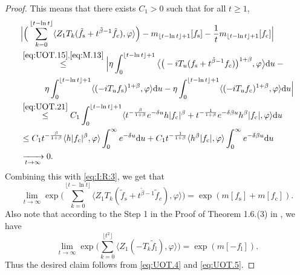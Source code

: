 \documentclass[12pt,a4paper]{amsart}
\theoremstyle{plain}
\theoremstyle{definition}
\numberwithin{equation}{section}
\begin{document}
\begin{proof}
	This means that there exists $C_1 >0$ such that for all $t\geq 1$,
\begin{align}
	&\Big|\Big(\sum_{k=0}^{\lfloor t-\ln t \rfloor} \langle Z_1T_{k}(\tilde f_\mathrm s+t^{\tilde{\beta}-1}\tilde{f}_c), \varphi\rangle \Big)-m_{\lfloor t-\ln t \rfloor+1}[f_\mathrm s]-\frac{1}{t}m_{\lfloor t-\ln t \rfloor+1}[f_\mathrm c]\Big|
	\\&
\begin{multlined}
	\overset{\eqref{eq:UOT.15},\eqref{eq:M.13}}\leq\Big| \eta \int_0^{\lfloor t-\ln t \rfloor+1}\big\langle \big(-iT_u(f_\mathrm s+t^{\tilde{\beta}-1}f_\mathrm c)\big)^{1+\beta},\varphi \big\rangle \mathrm du - {}
	\\ \eta \int_0^{\lfloor t-\ln t \rfloor+1} \langle (-iT_u f_\mathrm s)^{1+\beta}, \varphi \rangle  \mathrm du - \eta \int_0^{\lfloor t-\ln t \rfloor+1} \langle (-iT_u f_\mathrm c)^{1+\beta}, \varphi \rangle  \mathrm du\Big|
\end{multlined}
	\\ & \overset{\eqref{eq:UOT.21}}\leq C_1\int_0^{\lfloor t-\ln t \rfloor+1}\langle t^{-\frac{\beta}{1+\beta}}e^{-\delta u}h|f_\mathrm c|^{\beta}+t^{-\frac{1}{1+\beta}}e^{-\delta\beta u}h^{\beta}|f_\mathrm c|, \varphi \rangle \mathrm du
	\\& \leq C_1 t^{-\frac{\beta}{1+\beta}} \langle h|f_\mathrm c|^{\beta},\varphi \rangle \int_0^\infty e^{-\delta u} \mathrm du + C_1 t^{-\frac{1}{1+\beta}} \langle h^\beta|f_\mathrm c|,\varphi \rangle \int_0^\infty e^{-\delta \beta u} \mathrm du
	\\& \xrightarrow[t\rightarrow \infty]{} 0.
\end{align}
	Combining this with \eqref{eq:I:R:3}, we get that
\begin{equation}
\label{eq:UOT.4}
	\lim_{t\rightarrow \infty}\exp\Big(\sum_{k=0}^{\lfloor t-\ln t \rfloor} \langle Z_1T_{k}(\tilde f_\mathrm s+t^{\tilde{\beta}-1}\tilde{f}_c), \varphi\rangle \Big)  = \exp( m[f_\mathrm s]+m[f_\mathrm c]).
\end{equation}
	Also note that according to the Step 1 in the Proof of Theorem 1.6.(3) in \cite{RenSongSunZhao2019Stable}, we have
\begin{equation}
\label{eq:UOT.5}
	\lim_{t\rightarrow \infty}\exp\Big(\sum_{k=0}^{\lfloor t^2 \rfloor}\langle Z_1(-T_k\tilde{f}_\mathrm l),\varphi\rangle\Big) =\exp(m[-f_\mathrm l]).
\end{equation}
	Thus the desired claim follows from \eqref{eq:UOT.4} and \eqref{eq:UOT.5}.
\end{proof}
\end{document}
